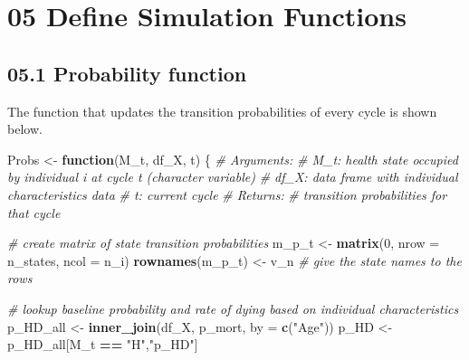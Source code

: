 \documentclass[
]{article}
\newenvironment{Shaded}{\begin{snugshade}}{\end{snugshade}}
\newcommand{\CommentTok}[1]{\textcolor[rgb]{0.56,0.35,0.01}{\textit{#1}}}
\newcommand{\ControlFlowTok}[1]{\textcolor[rgb]{0.13,0.29,0.53}{\textbf{#1}}}
\newcommand{\DataTypeTok}[1]{\textcolor[rgb]{0.13,0.29,0.53}{#1}}
\newcommand{\DecValTok}[1]{\textcolor[rgb]{0.00,0.00,0.81}{#1}}
\newcommand{\KeywordTok}[1]{\textcolor[rgb]{0.13,0.29,0.53}{\textbf{#1}}}
\newcommand{\NormalTok}[1]{#1}
\newcommand{\OperatorTok}[1]{\textcolor[rgb]{0.81,0.36,0.00}{\textbf{#1}}}
\newcommand{\StringTok}[1]{\textcolor[rgb]{0.31,0.60,0.02}{#1}}
\begin{document}
\hypertarget{define-simulation-functions}{%
\section{05 Define Simulation
Functions}\label{define-simulation-functions}}

\hypertarget{probability-function}{%
\subsection{05.1 Probability function}\label{probability-function}}

The function that updates the transition probabilities of every cycle is
shown below.

\begin{Shaded}
\begin{Highlighting}[]
\NormalTok{Probs <-}\StringTok{ }\ControlFlowTok{function}\NormalTok{(M_t, df_X, t) \{ }
  \CommentTok{# Arguments:}
    \CommentTok{# M_t: health state occupied by individual i at cycle t (character variable)}
    \CommentTok{# df_X:     data frame with individual characteristics data }
  \CommentTok{# t:     current cycle }
\CommentTok{# Returns: }
  \CommentTok{#   transition probabilities for that cycle}
  
  \CommentTok{# create matrix of state transition probabilities  }
\NormalTok{  m_p_t           <-}\StringTok{ }\KeywordTok{matrix}\NormalTok{(}\DecValTok{0}\NormalTok{, }\DataTypeTok{nrow =}\NormalTok{ n_states, }\DataTypeTok{ncol =}\NormalTok{ n_i) }
  \KeywordTok{rownames}\NormalTok{(m_p_t) <-}\StringTok{  }\NormalTok{v_n  }\CommentTok{# give the state names to the rows}
  
  \CommentTok{# lookup baseline probability and rate of dying based on individual characteristics}
\NormalTok{  p_HD_all <-}\StringTok{ }\KeywordTok{inner_join}\NormalTok{(df_X, p_mort, }\DataTypeTok{by =} \KeywordTok{c}\NormalTok{(}\StringTok{"Age"}\NormalTok{))}
\NormalTok{  p_HD     <-}\StringTok{ }\NormalTok{p_HD_all[M_t }\OperatorTok{==}\StringTok{ "H"}\NormalTok{,}\StringTok{"p_HD"}\NormalTok{]}
  

\end{Highlighting}
\end{Shaded}
\end{document}
